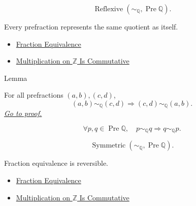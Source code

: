 \begin{remark*}
\[
\operatorname{Reflexive}(\sim_{\mathbb{Q}},\operatorname{Pre}\mathbb{Q}).
\]
\end{remark*}

\begin{remark*}[Interpretation]
Every prefraction represents the same quotient as itself.
\end{remark*}

\begin{dependencies}
\begin{itemize}
  \item \hyperref[def:fraction-equivalence]{Fraction Equivalence}
  \item \hyperref[thm:multiplication-on-z-commutative]{Multiplication on $\mathbb{Z}$ Is Commutative}
\end{itemize}
\end{dependencies}

\begin{lemmabox}{Lemma}
\begin{lemma}
\label{lem:fraction-equivalence-symmetric}
For all prefractions $(a,b),(c,d)$,
\[
(a,b)\sim_{\mathbb{Q}}(c,d)
\Longrightarrow
(c,d)\sim_{\mathbb{Q}}(a,b).
\]
\hyperref[prf:fraction-equivalence-symmetric]{\textit{Go to proof.}}
\end{lemma}
\end{lemmabox}

\begin{remark*}
\[
\forall p,q\in\operatorname{Pre}\mathbb{Q},\quad
p\sim_{\mathbb{Q}}q \Longrightarrow q\sim_{\mathbb{Q}}p.
\]
\end{remark*}

\begin{remark*}
\[
\operatorname{Symmetric}(\sim_{\mathbb{Q}},\operatorname{Pre}\mathbb{Q}).
\]
\end{remark*}

\begin{remark*}[Interpretation]
Fraction equivalence is reversible.
\end{remark*}

\begin{dependencies}
\begin{itemize}
  \item \hyperref[def:fraction-equivalence]{Fraction Equivalence}
  \item \hyperref[thm:multiplication-on-z-commutative]{Multiplication on $\mathbb{Z}$ Is Commutative}
\end{itemize}
\end{dependencies}

